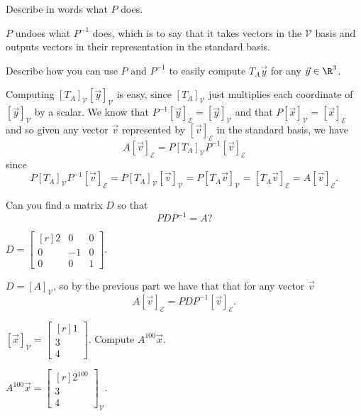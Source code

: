 \documentclass{problemset}
\newcommand{\mat}[1]{\begin{bmatrix*}[r]#1\end{bmatrix*}}
\begin{document}
	\begin{parts}
		\item Describe in words what $P$ does.
			\begin{solution}
				$P$ undoes what $P^{-1}$ does, which is to say that it takes vectors
				in the $\mathcal V$ basis and outputs vectors in their representation
				in the standard basis.
			\end{solution}
		\item Describe how you can use $P$ and $P^{-1}$ to easily compute
			$T_A\vec y$ for any $\vec y\in \R^3$.
			\begin{solution}
				Computing $[T_A]_{\mathcal V}[\vec y]_{\mathcal V}$ is easy, since
				$[T_A]_{\mathcal V}$ just multiplies each coordinate of $[\vec y]_{\mathcal V}$
				by a scalar. We know that $P^{-1}[\vec y]_{\mathcal E}=[\vec y]_{\mathcal V}$ 
				and that $P[\vec x]_{\mathcal V}=[\vec x]_{\mathcal E}$ and so 
				given any vector $\vec v$ represented by $[\vec v]_{\mathcal E}$
				in the standard basis, we have
				\[
					A[\vec v]_{\mathcal E}=P[T_A]_{\mathcal V}P^{-1}[\vec v]_{\mathcal E}
				\]
				since
				\[
					P[T_A]_{\mathcal V}P^{-1}[\vec v]_{\mathcal E}
					=P[T_A]_{\mathcal V}[\vec v]_{\mathcal V}
					=P[T_A\vec v]_{\mathcal V}
					=[T_A\vec v]_{\mathcal E}
					=A[\vec v]_{\mathcal E}.
				\]
			\end{solution}
		\item Can you find a matrix $D$ so that
			\[
				PDP^{-1}=A?
			\]
			\begin{solution}
				$D=\mat{2&0&0\\0&-1&0\\0&0&1}$.

				$D=[A]_{\mathcal V}$, so by the previous part we have that
				that for any vector $\vec v$
				\[
					A[\vec v]_{\mathcal E}=PDP^{-1}[\vec v]_{\mathcal E}.
				\]
			\end{solution}
		\item $[\vec x]_{\mathcal V}=\mat{1\\3\\4}$.  Compute $A^{100}\vec x$.
			\begin{solution}
				$A^{100}\vec x=\mat{2^{100}\\3\\4}_{\mathcal V}$.


\end{solution}
\end{parts}
\end{document}
